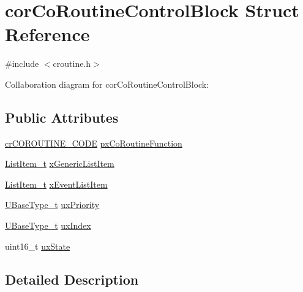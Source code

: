 \hypertarget{structcor_co_routine_control_block}{}\section{cor\+Co\+Routine\+Control\+Block Struct Reference}
\label{structcor_co_routine_control_block}


{\ttfamily \#include $<$croutine.\+h$>$}



Collaboration diagram for cor\+Co\+Routine\+Control\+Block\+:
\subsection*{Public Attributes}
\begin{DoxyCompactItemize}
\item 
\hyperlink{vendor_2ceedling_2plugins_2freertos_2vendor_2freertos_2include_2croutine_8h_a397a7505718dd366d8411ce324c49758}{cr\+C\+O\+R\+O\+U\+T\+I\+N\+E\+\_\+\+C\+O\+DE} \hyperlink{structcor_co_routine_control_block_acc98c7364cd88e8e034a5f9bba113832}{px\+Co\+Routine\+Function}
\item 
\hyperlink{externals_2freertos_2include_2list_8h_a1a62d469392f9bfe2443e7efab9c8398}{List\+Item\+\_\+t} \hyperlink{structcor_co_routine_control_block_aa2900494db8782eeb8ef12d482501406}{x\+Generic\+List\+Item}
\item 
\hyperlink{externals_2freertos_2include_2list_8h_a1a62d469392f9bfe2443e7efab9c8398}{List\+Item\+\_\+t} \hyperlink{structcor_co_routine_control_block_a105d316da0069f766acc3b210afed1b9}{x\+Event\+List\+Item}
\item 
\hyperlink{externals_2freertos_2portable_2_g_c_c_2_a_r_m___c_m0_2portmacro_8h_a646f89d4298e4f5afd522202b11cb2e6}{U\+Base\+Type\+\_\+t} \hyperlink{structcor_co_routine_control_block_a752101a5d41b5caa7fd5149436613c8f}{ux\+Priority}
\item 
\hyperlink{externals_2freertos_2portable_2_g_c_c_2_a_r_m___c_m0_2portmacro_8h_a646f89d4298e4f5afd522202b11cb2e6}{U\+Base\+Type\+\_\+t} \hyperlink{structcor_co_routine_control_block_a6c185cd2145f562fb570bea9b158fc81}{ux\+Index}
\item 
uint16\+\_\+t \hyperlink{structcor_co_routine_control_block_aa0d702ff5a23c61598fe13e5a78fb1dc}{ux\+State}
\end{DoxyCompactItemize}


\subsection{Detailed Description}


